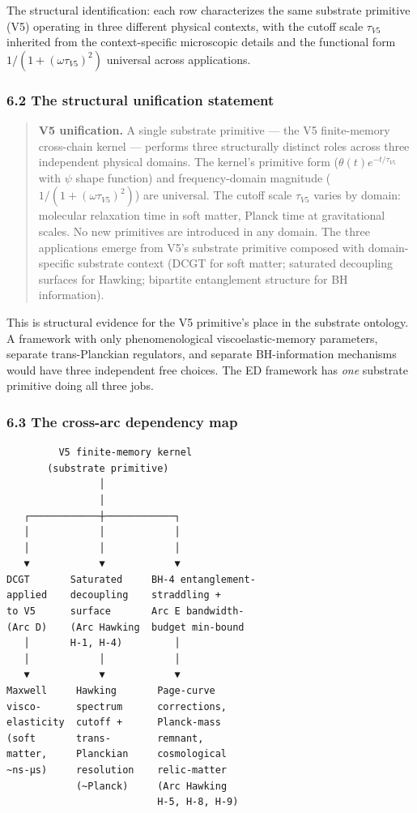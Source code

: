 \documentclass[
  11pt,
  a4paperpaper,
]{article}
\begin{document}
The structural identification: each row characterizes the same substrate
primitive (V5) operating in three different physical contexts, with the
cutoff scale \(\tau_{V5}\) inherited from the context-specific
microscopic details and the functional form
\(1/(1+(\omega\tau_{V5})^2)\) universal across applications.

\subsubsection{6.2 The structural unification
statement}\label{the-structural-unification-statement}

\begin{quote}
\textbf{V5 unification.} A single substrate primitive --- the V5
finite-memory cross-chain kernel --- performs three structurally
distinct roles across three independent physical domains. The kernel's
primitive form (\(\theta(t) e^{-t/\tau_{V5}}\) with \(\psi\) shape
function) and frequency-domain magnitude (\(1/(1+(\omega\tau_{V5})^2)\))
are universal. The cutoff scale \(\tau_{V5}\) varies by domain:
molecular relaxation time in soft matter, Planck time at gravitational
scales. No new primitives are introduced in any domain. The three
applications emerge from V5's substrate primitive composed with
domain-specific substrate context (DCGT for soft matter; saturated
decoupling surfaces for Hawking; bipartite entanglement structure for BH
information).
\end{quote}

This is structural evidence for the V5 primitive's place in the
substrate ontology. A framework with only phenomenological
viscoelastic-memory parameters, separate trans-Planckian regulators, and
separate BH-information mechanisms would have three independent free
choices. The ED framework has \emph{one} substrate primitive doing all
three jobs.

\subsubsection{6.3 The cross-arc dependency
map}\label{the-cross-arc-dependency-map}

\begin{verbatim}
         V5 finite-memory kernel
       (substrate primitive)
                │
                │
   ┌────────────┼────────────┐
   │            │            │
   │            │            │
   ▼            ▼            ▼
DCGT       Saturated     BH-4 entanglement-
applied    decoupling    straddling +
to V5      surface       Arc E bandwidth-
(Arc D)    (Arc Hawking  budget min-bound
   │       H-1, H-4)         │
   │            │            │
   ▼            ▼            ▼
Maxwell     Hawking       Page-curve
visco-      spectrum      corrections,
elasticity  cutoff +      Planck-mass
(soft       trans-        remnant,
matter,     Planckian     cosmological
~ns-μs)     resolution    relic-matter
            (~Planck)     (Arc Hawking
                          H-5, H-8, H-9)
\end{verbatim}
\end{document}
